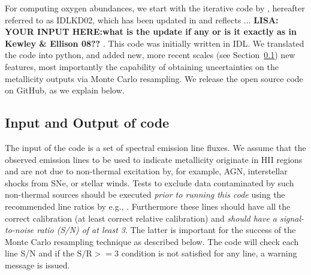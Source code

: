 \documentclass{emulateapj}
\begin{document}
\begin{figure}[!ht]
 \label{metallicity_distribution}
\end{figure}


For computing oxygen abundances, we start with the iterative code by \citet{kewley02}, hereafter referred to as IDLKD02, which has been updated in \citet{kewley08} and reflects ... \textbf{LISA: YOUR INPUT HERE:what is the update if any or is it exactly as in Kewley \& Ellison 08?? }. This code was initially written in IDL.  We translated the code into python, and added new, more recent scales (see Section~\ref{sec:IO}) new features, most importantly the capability of obtaining uncertainties on the metallicity outputs via Monte Carlo resampling. We release the open source code on GitHub, as we explain below.


\subsection{Input and Output of code}\label{sec:IO}

The input of the code is a set of spectral emission line fluxes. We assume that the observed emission lines to be used to indicate metallicity originate in HII regions and are not due to non-thermal excitation by, for example, AGN, interstellar shocks from SNe, or stellar winds.  Tests to exclude data contaminated by such non-thermal sources should be executed \emph{prior to running this code} using the recommended line ratios by e.g., \citealt{baldwin81,kauffmann03,kewley06_sdss}. Furthermore these lines should have all the correct calibration (at least correct relative calibration) and \emph{should have a signal-to-noise ratio (S/N) of at least 3}. The latter is important for the success of the Monte Carlo resampling technique as described below. The code will check each line S/N and if the $\mathrm{S/R} >= 3$ condition is not satisfied for any line, a warning message is issued.
\end{document}
